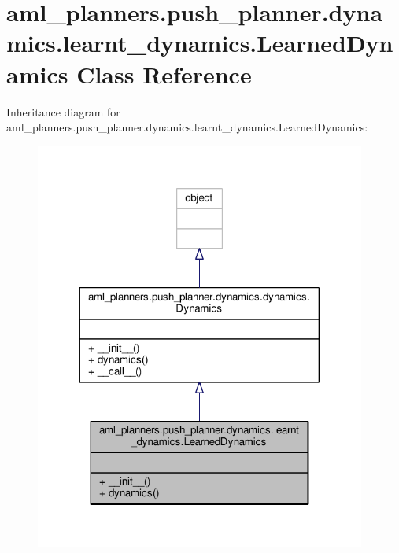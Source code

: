 \hypertarget{classaml__planners_1_1push__planner_1_1dynamics_1_1learnt__dynamics_1_1_learned_dynamics}{\section{aml\-\_\-planners.\-push\-\_\-planner.\-dynamics.\-learnt\-\_\-dynamics.\-Learned\-Dynamics Class Reference}
\label{classaml__planners_1_1push__planner_1_1dynamics_1_1learnt__dynamics_1_1_learned_dynamics}
}


Inheritance diagram for aml\-\_\-planners.\-push\-\_\-planner.\-dynamics.\-learnt\-\_\-dynamics.\-Learned\-Dynamics\-:
\nopagebreak
\begin{figure}[H]
\begin{center}
\leavevmode
\includegraphics[width=308pt]{classaml__planners_1_1push__planner_1_1dynamics_1_1learnt__dynamics_1_1_learned_dynamics__inherit__graph}
\end{center}
\end{figure}


